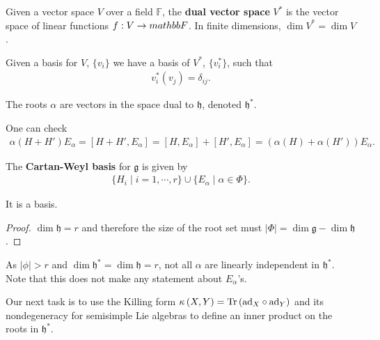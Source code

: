 \begin{definition}
    Given a vector space $V$ over a field $\mathbb{F}$, the \textbf{dual vector space} $V^{*}$ is the vector space of linear functions $f : V \to \\mathbb{F}$.  In finite dimensions, $\dim V^{*} = \dim V$.
\end{definition}

Given a basis for $V$, $\{v_i\} $ we have a basis of $V^{*}$, $\{v_i^{*}\}$, such that
\begin{align}
    v_i^{*}\left( v_j \right) = \delta_{ij}
.\end{align}

\begin{claim}
    The roots $\alpha$ are vectors in the space dual to $\mathfrak{h}$, denoted $\mathfrak{h}^{*}$.
\end{claim}

One can check
\begin{align}
    \alpha \left( H + H' \right) E_\alpha = \left[ H + H', E_{\alpha} \right] = \left[ H, E_\alpha \right] + \left[ H', E_\alpha \right] = \left( \alpha \left( H \right) + \alpha \left( H' \right)  \right) E_\alpha
.\end{align}

\begin{definition}
    The \textbf{Cartan-Weyl basis} for $\mathfrak{g}$ is given by
    \begin{align}
        \{H_i  \mid i=1,\cdots, r\} \cup \{E_\alpha  \mid \alpha \in \Phi\} 
    .\end{align}
\end{definition}

\begin{claim}
    It is a basis.
\end{claim}

\begin{proof}
    $\dim \mathfrak{h} = r$ and therefore the size of the root set must $\left| \Phi \right| = \dim \mathfrak{g} - \dim \mathfrak{h}$.
\end{proof}

As $\left| \phi \right| > r$ and $\dim \mathfrak{h}^{*} = \dim \mathfrak{h} = r$, not all $\alpha$ are linearly independent in $\mathfrak{h}^{*}$. Note that this does not make any statement about $E_\alpha$'s.

Our next task is to use the Killing form $\kappa \left( X,Y \right) = \Tr \left( \text{ad}_X \circ \text{ad}_Y \right) $ and its nondegeneracy for semisimple Lie algebras to define an inner product on the roots in $\mathfrak{h}^{*}$.

